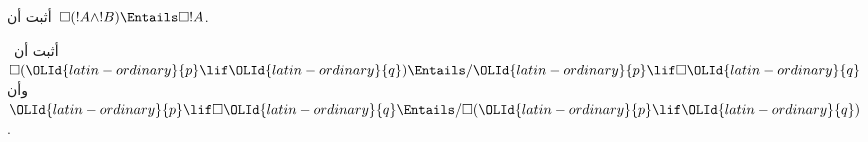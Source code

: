 \documentclass[../../../include/open-logic-section]{subfiles}
\begin{document}
\begin{prob}
  أثبت أن~$\Box (!A \land !B) \Entails \Box !A$.
\end{prob}

\begin{prob}
  أثبت أن~$\Box (\OLId{latin-ordinary}{p} \lif \OLId{latin-ordinary}{q}) \Entails/ \OLId{latin-ordinary}{p} \lif \Box \OLId{latin-ordinary}{q}$ وأن
  $\OLId{latin-ordinary}{p} \lif \Box \OLId{latin-ordinary}{q} \Entails/\Box (\OLId{latin-ordinary}{p} \lif \OLId{latin-ordinary}{q})$.
\end{prob}
\end{document}
